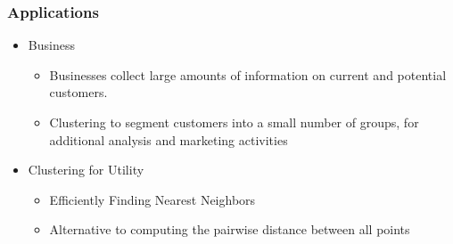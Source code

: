 \begin{frame}[fragile]\frametitle{Applications}
\begin{itemize}
\item Business
	\begin{itemize}
	\item Businesses collect large amounts of information on current and potential customers.
	\item Clustering to segment customers into a small number of groups, for additional analysis and marketing activities
	\end{itemize}
\item Clustering for Utility
	\begin{itemize}
	\item Efficiently Finding Nearest Neighbors
	\item Alternative to computing the pairwise distance between all points
	\end{itemize}
\end{itemize}
\end{frame}



